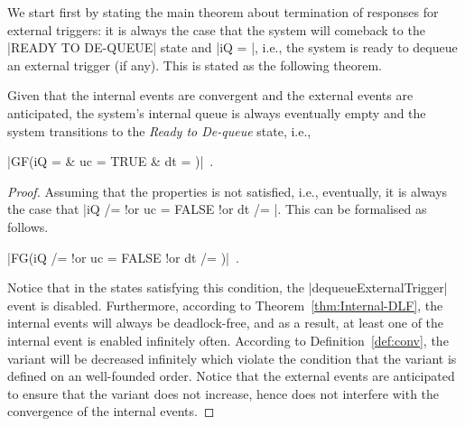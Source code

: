 We start first by stating the main theorem about termination of
responses for external triggers: it is always the case that the system
will comeback to the |READY TO DE-QUEUE| state and |iQ = {}|, i.e.,
the system is ready to dequeue an external trigger (if any).  This is
stated as the following theorem.
\begin{theorem}
  \label{thm:finite-internal-events}
  Given that the internal events are convergent and the external
  events are anticipated, the system's internal queue is always
  eventually empty and the system transitions to the \emph{Ready to
    De-queue} state, i.e.,
  \begin{center}
    |GF(iQ = {} & uc = TRUE & dt = {})|~.
  \end{center}
\end{theorem}
\begin{proof}
  Assuming that the properties is not satisfied, i.e., eventually,
  it is always the case that %
  |iQ /= {} !or  uc = FALSE !or dt /=  {}|.  %
  This can be formalised as follows.
  \begin{center}
    |FG(iQ /= {} !or uc = FALSE !or dt /= {})|~.    
  \end{center}
  Notice that in the states satisfying this condition, the
  |dequeueExternalTrigger| event is disabled.  Furthermore, according
  to Theorem~\ref{thm:Internal-DLF}, the internal events
  will always be deadlock-free, and as a result, at least one
  of the internal event is enabled infinitely often. According to
  Definition~\ref{def:conv}, the variant will be decreased infinitely
  which violate the condition that the variant is defined on an
  well-founded order.  Notice that the external events are
  anticipated to ensure that the variant does not increase, hence
  does not interfere with the convergence of the internal events.
\end{proof}

